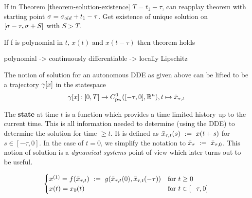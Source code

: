 \begin{corollary}
    \label{cor:continuability-of-solution}

    If in Theorem \ref{theorem-solution-existence} $T=t_1-\tau$, can reapplay theorem with starting point $\sigma=\sigma_{old}+t_1-\tau$. Get existence of unique solution on $[\sigma-\tau,\sigma+S]$ with $S>T$.
\end{corollary}

\begin{corollary}
    \label{corollary}
    If f is polynomial in $t$, $x(t)$ and $x(t-\tau)$ then theorem holds

    polynomial -> continuously differentiable -> locally Lipschitz


    The notion of solution for an autonomous DDE as given above can be lifted to be a trajectory $\gamma[x]$ in the statespace
    \begin{equation}
        \trajectory[x] \from [0,T] \to \statespace[\tau],\\
        t \mapsto \xbartaut{t}
    \end{equation}

    The \textbf{state} at time $t$ is a function which provides a time limited history up to the current time. This is all information needed to determine (using the DDE) to determine the solution for time $\geq t$. It is defined as $\bar{x}_{\tau,t}(s)~\mathrel{\mathop{:}}=~ x(t+s)$ for $s\in [-\tau,0]$. In the case of $t=0$, we simplify the notation to $\bar{x}_{\tau} ~\mathrel{\mathop{:}}=~ \bar{x}_{\tau,0}$.
    This notion of solution is a \emph{dynamical systems} point of view which later turns out to be useful.

    


\begin{equation}
    \begin{cases}
        \D{x}=f(\xbartaut{t})\defeq g(\xbartaut{t}(0),\xbartaut{t}(-\tau)) &\text{for } t\geq 0\\
        x(t)=x_0(t) & \text{for } t\in[-\tau,0]
    \end{cases}
\end{equation}
\end{corollary}

